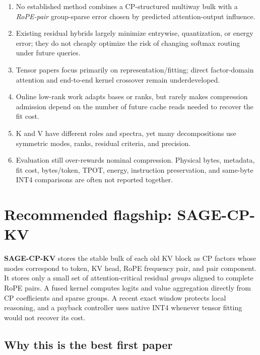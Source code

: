\documentclass[10pt]{article}
\begin{document}
\begin{gapbox}[title={Six defensible research gaps}]
\begin{enumerate}[leftmargin=1.55em,itemsep=3pt,topsep=2pt]
\item No established method combines a CP-structured multiway bulk with a \emph{RoPE-pair}
group-sparse error chosen by predicted attention-output influence.
\item Existing residual hybrids largely minimize entrywise, quantization, or energy error; they do
not cheaply optimize the risk of changing softmax routing under future queries.
\item Tensor papers focus primarily on representation/fitting; direct factor-domain attention and
end-to-end kernel crossover remain underdeveloped.
\item Online low-rank work adapts bases or ranks, but rarely makes compression admission depend on
the number of future cache reads needed to recover the fit cost.
\item K and V have different roles and spectra, yet many decompositions use symmetric modes,
ranks, residual criteria, and precision.
\item Evaluation still over-rewards nominal compression. Physical bytes, metadata, fit cost,
bytes/token, TPOT, energy, instruction preservation, and same-byte INT4 comparisons are often not
reported together.
\end{enumerate}
\end{gapbox}

\section{Recommended flagship: SAGE-CP-KV}

\begin{methodbox}[title={Softmax-Aware Group-sparse Error-corrected CP KV cache}]
\textbf{SAGE-CP-KV} stores the stable bulk of each old KV block as CP factors whose modes correspond
to token, KV head, RoPE frequency pair, and pair component. It stores only a small set of
attention-critical residual \emph{groups} aligned to complete RoPE pairs. A fused kernel computes
logits and value aggregation directly from CP coefficients and sparse groups. A recent exact
window protects local reasoning, and a payback controller uses native INT4 whenever tensor fitting
would not recover its cost.
\end{methodbox}

\subsection{Why this is the best first paper}
\end{document}
